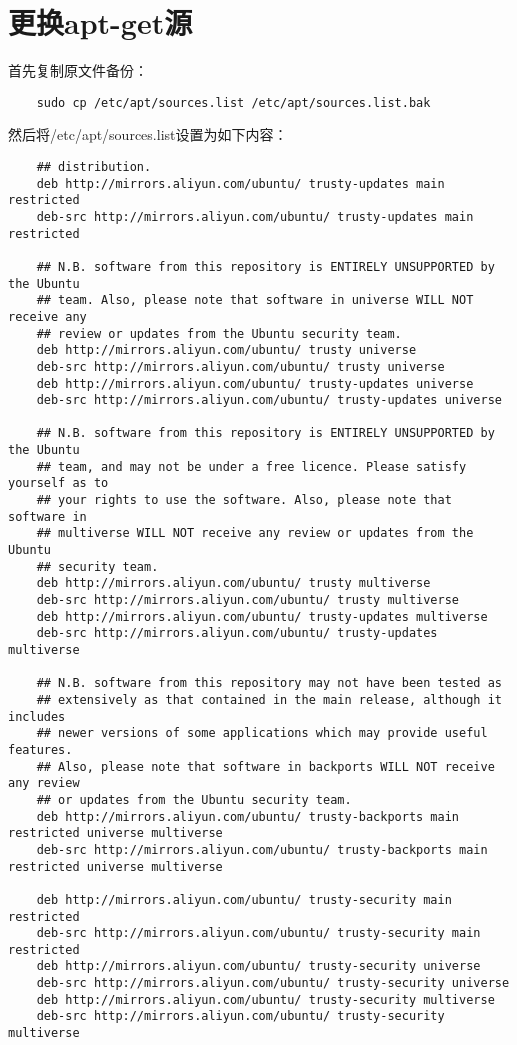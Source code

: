 \documentclass[a4paper,left=2.5cm,right=2.5cm,11pt]{article}
\begin{document}

\clearpage

\section{更换apt-get源}
	首先复制原文件备份：
	\begin{lstlisting}
	sudo cp /etc/apt/sources.list /etc/apt/sources.list.bak
	\end{lstlisting}

	然后将/etc/apt/sources.list设置为如下内容：
	\begin{lstlisting}
	## distribution.
	deb http://mirrors.aliyun.com/ubuntu/ trusty-updates main restricted
	deb-src http://mirrors.aliyun.com/ubuntu/ trusty-updates main restricted

	## N.B. software from this repository is ENTIRELY UNSUPPORTED by the Ubuntu
	## team. Also, please note that software in universe WILL NOT receive any
	## review or updates from the Ubuntu security team.
	deb http://mirrors.aliyun.com/ubuntu/ trusty universe
	deb-src http://mirrors.aliyun.com/ubuntu/ trusty universe
	deb http://mirrors.aliyun.com/ubuntu/ trusty-updates universe
	deb-src http://mirrors.aliyun.com/ubuntu/ trusty-updates universe

	## N.B. software from this repository is ENTIRELY UNSUPPORTED by the Ubuntu 
	## team, and may not be under a free licence. Please satisfy yourself as to 
	## your rights to use the software. Also, please note that software in 
	## multiverse WILL NOT receive any review or updates from the Ubuntu
	## security team.
	deb http://mirrors.aliyun.com/ubuntu/ trusty multiverse
	deb-src http://mirrors.aliyun.com/ubuntu/ trusty multiverse
	deb http://mirrors.aliyun.com/ubuntu/ trusty-updates multiverse
	deb-src http://mirrors.aliyun.com/ubuntu/ trusty-updates multiverse

	## N.B. software from this repository may not have been tested as
	## extensively as that contained in the main release, although it includes
	## newer versions of some applications which may provide useful features.
	## Also, please note that software in backports WILL NOT receive any review
	## or updates from the Ubuntu security team.
	deb http://mirrors.aliyun.com/ubuntu/ trusty-backports main restricted universe multiverse
	deb-src http://mirrors.aliyun.com/ubuntu/ trusty-backports main restricted universe multiverse

	deb http://mirrors.aliyun.com/ubuntu/ trusty-security main restricted
	deb-src http://mirrors.aliyun.com/ubuntu/ trusty-security main restricted
	deb http://mirrors.aliyun.com/ubuntu/ trusty-security universe
	deb-src http://mirrors.aliyun.com/ubuntu/ trusty-security universe
	deb http://mirrors.aliyun.com/ubuntu/ trusty-security multiverse
	deb-src http://mirrors.aliyun.com/ubuntu/ trusty-security multiverse


\end{lstlisting}
\end{document}
